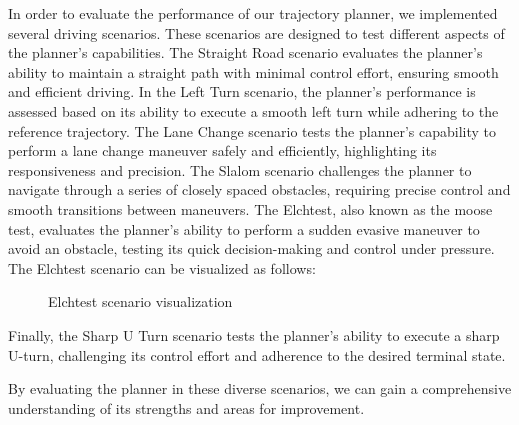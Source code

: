 In order to evaluate the performance of our trajectory planner, we implemented several driving scenarios.
These scenarios are designed to test different aspects of the planner's capabilities.
The Straight Road scenario evaluates the planner's ability to maintain a straight path with minimal control effort, ensuring smooth and efficient
driving.
In the Left Turn scenario, the planner's performance is assessed based on its ability to execute a smooth left turn while adhering to the reference
trajectory.
The Lane Change scenario tests the planner's capability to perform a lane change maneuver safely and efficiently, highlighting its responsiveness and
precision.
The Slalom scenario challenges the planner to navigate through a series of closely spaced obstacles, requiring precise control and smooth transitions
between maneuvers.
The Elchtest, also known as the moose test, evaluates the planner's ability to perform a sudden evasive maneuver to avoid an obstacle, testing its
quick decision-making and control under pressure.
The Elchtest scenario can be visualized as follows:
\begin{figure}[H]
	\centering
	\caption{Elchtest scenario visualization}
	\label{fig:elchtest}
\end{figure}

Finally, the Sharp U Turn scenario tests the planner's ability to execute a sharp U-turn, challenging its control effort and adherence to the desired
terminal state.

By evaluating the planner in these diverse scenarios, we can gain a comprehensive understanding of its strengths and areas for improvement.


